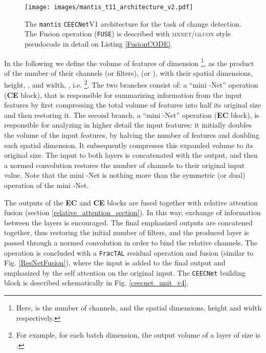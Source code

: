 \documentclass[times, 5p]{elsarticle}
\def \FracTAL {\texttt{FracTAL} }
\newcommand{\ceecnet}{\texttt{CEECNet}}
\newcommand{\mantis}{\texttt{mantis}}
\begin{document}
\begin{figure}
\centering
\texttt{[image: images/mantis\_t11\_architecture\_v2.pdf]}
\caption{The \mantis{} \ceecnet V1 architecture for the task of change detection.  The Fusion  operation (\texttt{FUSE}) is described with \textsc{mxnet/gluon} style pseudocode in detail on Listing \ref{FusionCODE}.} 
\label{mantis_t11_architecture}
\end{figure}

In the following we define the volume  of  features of dimension \footnote{Here,  is the number of channels,  and  the spatial dimensions, height and width respectively.}, as the product of the number of their channels (or filters),  (or ), with their spatial dimensions, height, , and width, , i.e. \footnote{For example, for each batch dimension, the output volume of a  layer of size  is .}. 
The two branches consist of: a ``mini -Net'' operation (\textbf{CE} block), that is responsible for summarizing information from the input features by first compressing the total volume of features into half its original size and then restoring it. The second branch,  a ``mini -Net'' operation (\textbf{EC} block), is responsible for analyzing in higher detail the input features: it initially doubles the volume of the input features, by halving the number of features and doubling each spatial dimension.  It subsequently compresses this expanded volume to its original size. The input to both layers is concatenated with the output, and then a normed convolution restores the number of channels to their original input value. Note that the mini -Net is nothing more than the symmetric (or dual) operation of the mini -Net. 




The outputs of the \textbf{EC} and \textbf{CE} blocks are fused together with relative attention fusion (section \ref{relative_attention_section}). In this way, exchange of information between the layers is encouraged. The final emphasized outputs are concatened together, thus restoring the initial number of filters, and the produced layer is passed through a normed convolution in order to bind the relative channels.  The operation is concluded with a \FracTAL residual operation and fusion (similar to Fig. \ref{ResNetFusion}), where the input is added to the final output and emphasized by the self attention on the original input. 
The \ceecnet{} building block is described schematically in Fig. \ref{ceecnet_unit_v4}. 
\end{document}
